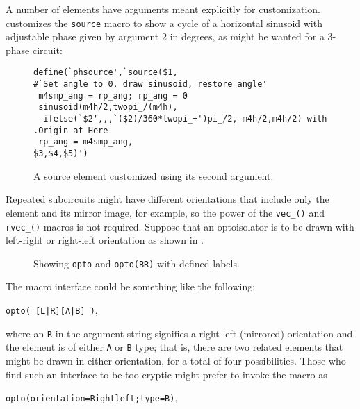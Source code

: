 A number of elements have arguments meant explicitly for customization.
 customizes the {\tt source} macro to show a cycle of a horizontal
sinusoid with adjustable phase given by argument 2 in degrees,
as might be wanted for a 3-phase circuit:
\begin{figure}[ht]
\hfill
 \vspace*{-0.5in}
\begin{verbatim}
define(`phsource',`source($1,
#`Set angle to 0, draw sinusoid, restore angle'
 m4smp_ang = rp_ang; rp_ang = 0
 sinusoid(m4h/2,twopi_/(m4h),
  ifelse(`$2',,,`($2)/360*twopi_+')pi_/2,-m4h/2,m4h/2) with .Origin at Here
 rp_ang = m4smp_ang,
$3,$4,$5)')
\end{verbatim}
\vspace*{-\baselineskip}
   \caption{A source element customized using its second argument.}
   \label{Sinus}
   \end{figure}

Repeated subcircuits might have different orientations
that
include only the element and its mirror image, for example, so the
power of the \verb|vec_()| and \verb|rvec_()| macros is not required.
Suppose that an optoisolator is to be drawn with left-right or right-left
orientation as shown in .
\begin{figure}[h!t]
   
   \caption{Showing {\tt opto} and {\tt opto(BR)} with defined labels.}
   \label{Opto}
   \end{figure}

The macro interface could be something like the following:
\par
{\tt opto( [L|R][A|B] )},

\noindent where an {\tt R} in the argument string signifies a right-left
(mirrored) orientation and the element is of either {\tt A} or {\tt B} type;
that is, there are two related elements that might be drawn in either
orientation, for a total of four possibilities.
Those who find such an interface to be too cryptic might prefer to
invoke the macro as
\par
{\tt opto(orientation=Rightleft;type=B)},

